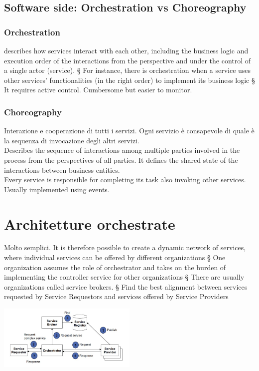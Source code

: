 \subsection{Software side: Orchestration vs Choreography}
\subsubsection{Orchestration}
describes how services interact with each other, including the business logic
and execution order of the interactions from the perspective and under the control of a single
actor (service).
§ For instance, there is orchestration when a service uses other services' functionalities (in the right
order) to implement its business logic
§ It requires active control. Cumbersome but easier to monitor.

\subsubsection{Choreography}
Interazione e cooperazione di tutti i servizi. Ogni servizio è consapevole di quale è la sequenza di invocazione degli altri servizi.
\\Describes the sequence of interactions among multiple parties involved in the process from the perspectives of all parties. It defines the shared state of the interactions between business entities.
\\Every service is responsible for completing its task also invoking other services. Usually implemented using events.

\section{Architetture orchestrate}
Molto semplici.
It is therefore possible to create a dynamic network of services, where individual services can be offered by
different organizations
§ One organization assumes the role of orchestrator and takes on the burden of implementing the controller
service for other organizations
§ There are usually organizations called service brokers.
§ Find the best alignment between services requested by Service Requestors and services offered by Service Providers
\begin{center}
    \includegraphics[width=0.5\textwidth]{img/ServicesComputing8.jpg}
\end{center}

